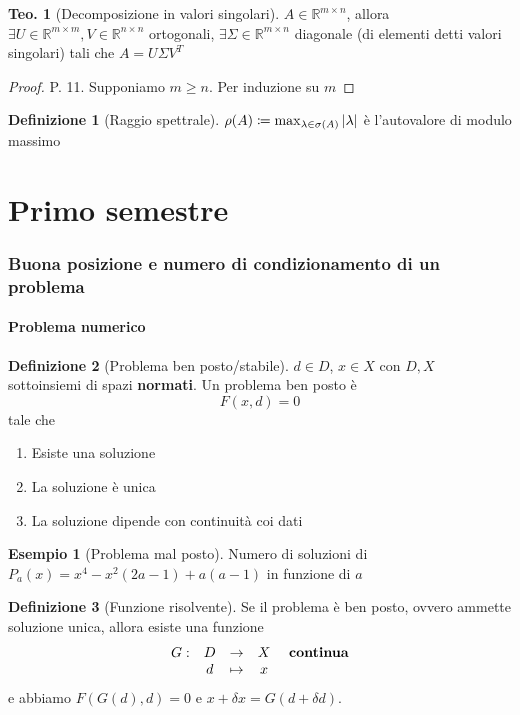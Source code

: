 \documentclass[a4paper,10pt]{article}
\theoremstyle{definition}
\theoremstyle{indentdefinition}
\newtheorem{defn}{Definizione}[section]
\theoremstyle{indenttheorem}
\newtheorem{thm}{Teo.}
\theoremstyle{myremark}
\newtheorem{example*}{Esempio}
\theoremstyle{indentgeneral}
\theoremstyle{plain}
\theoremstyle{plain}
\newenvironment{myboxed} 
{\noindent\begin{lrbox}{\mybox}\begin{minipage}{\textwidth}}
{\end{minipage}\end{lrbox}\fbox{\usebox{\mybox}}}
\begin{document}
\begin{myboxed}
\begin{thm}[Decomposizione in valori singolari]
$A\in\mathbb{R}^{m\times n}$, allora $\exists U\in\mathbb{R}^{m\times m},V\in\mathbb{R}^{n\times n}$
ortogonali, $\exists\Sigma\in\mathbb{R}^{m\times n}$ diagonale (di
elementi detti valori singolari) tali che $A=U\Sigma V^{T}$
\end{thm}
\end{myboxed}

\begin{proof}
   P. 11. Supponiamo $m\ge n$. Per induzione su $m$
\end{proof}

\begin{defn}[Raggio spettrale] $\rho(A)\coloneqq\max_{\lambda\in\sigma(A)}\abs{\lambda}$ è l'autovalore di modulo massimo
    
\end{defn}

\pagebreak{}

\part{Primo semestre}

\section{Buona posizione e numero di condizionamento di un problema}
\subsection{Problema numerico}
\begin{defn}[Problema ben posto/stabile]
  $d\in D$, $x\in X$ con $D,X$ sottoinsiemi di spazi \textbf{normati}. Un problema ben posto è $$F\left(x,d\right)=0$$ tale che
\begin{enumerate}
\item Esiste una soluzione
\item La soluzione è unica
\item La soluzione dipende con continuità coi dati
\end{enumerate}
\end{defn}
\begin{example*}[Problema mal posto]
Numero di soluzioni di $P_{a}\left(x\right)=x^{4}-x^{2}\left(2a-1\right)+a\left(a-1\right)$
in funzione di $a$
\end{example*}

\begin{defn}[Funzione risolvente] Se il problema è ben posto, ovvero ammette soluzione unica, allora esiste una funzione $$\begin{array}{ccccc}
   G:  & D & \to & X & \text{ \textbf{continua}}\\
     & d & \mapsto & x &
\end{array}$$
e abbiamo $F(G(d),d)=0$ e $x+\delta x =G(d+\delta d)$.
\end{defn}
\end{document}
